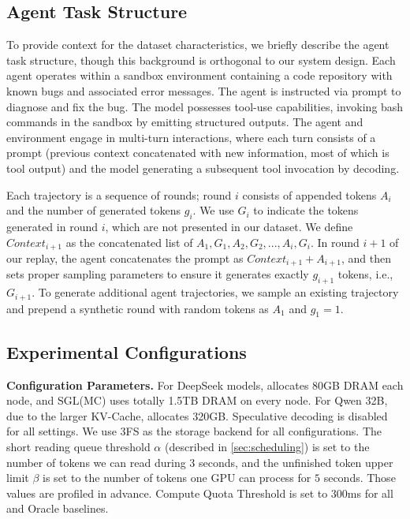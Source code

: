 \subsection{Agent Task Structure}
\label{sec:agent-task-structure}

To provide context for the dataset characteristics, we briefly describe the agent task structure, though this background is orthogonal to our system design.
Each agent operates within a sandbox environment containing a code repository with known bugs and associated error messages.
The agent is instructed via prompt to diagnose and fix the bug.
The model possesses tool-use capabilities, invoking bash commands in the sandbox by emitting structured outputs.
The agent and environment engage in multi-turn interactions, where each turn consists of a prompt (previous context concatenated with new information, most of which is tool output) and the model generating a subsequent tool invocation by decoding.

Each trajectory is a sequence of rounds; round $i$ consists of appended tokens $A_i$ and the number of generated tokens $g_i$.
We use $G_i$ to indicate the tokens generated in round $i$, which are not presented in our dataset.
We define $Context_{i+1}$ as the concatenated list of $A_1, G_1, A_2, G_2, ..., A_i, G_i$.
In round $i+1$ of our replay, the agent concatenates the prompt as $Context_{i+1} + A_{i+1}$, and then sets proper sampling parameters to ensure it generates exactly $g_{i+1}$ tokens, i.e., $G_{i+1}$.
To generate additional agent trajectories, we sample an existing trajectory and prepend a synthetic round with random tokens as $A_1$ and $g_1=1$.

\subsection{Experimental Configurations}
\label{sec:experimental-configurations}


\textbf{Configuration Parameters.}
For DeepSeek models, \sysname allocates 80GB DRAM each node, and SGL(MC) uses totally 1.5TB DRAM on every node.
For Qwen 32B, due to the larger KV-Cache, \sysname allocates 320GB.
Speculative decoding is disabled for all settings.
We use 3FS as the storage backend for all configurations.
The short reading queue threshold $\alpha$ (described in \autoref{sec:scheduling}) is set to the number of tokens we can read during $3$ seconds, and the unfinished token upper limit $\beta$ is set to the number of tokens one GPU can process for $5$ seconds. Those values are profiled in advance.
Compute Quota Threshold is set to 300ms for all \sysname and Oracle baselines.

